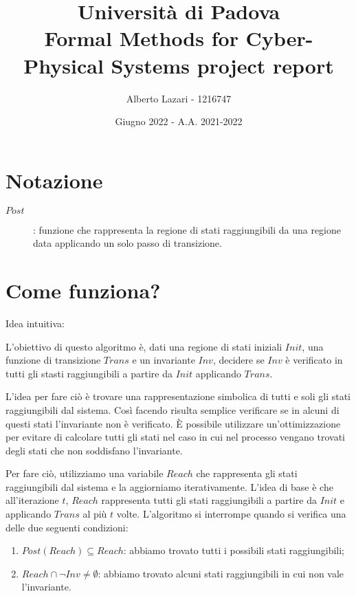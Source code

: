 \documentclass[12pt]{article}
\title{\textbf{Università di Padova \\ Formal Methods for Cyber-Physical Systems project report}}
\author{Alberto Lazari - 1216747\\}
\date{Giugno 2022 - A.A. 2021-2022}
\begin{document}
	\maketitle
	\pagebreak

	\tableofcontents
	\pagebreak

    \section{Notazione}
    \begin{description}
        \item[$Post$]: funzione che rappresenta la regione di stati raggiungibili da una regione data applicando un solo passo di transizione.
    \end{description}

	\section{Come funziona?}
	Idea intuitiva:

    L'obiettivo di questo algoritmo è, dati una regione di stati iniziali $Init$, una funzione di transizione $Trans$ e un invariante $Inv$, decidere se $Inv$ è verificato in tutti gli stasti raggiungibili a partire da $Init$ applicando $Trans$.

    L'idea per fare ciò è trovare una rappresentazione simbolica di tutti e soli gli stati raggiungibili dal sistema.
    Così facendo risulta semplice verificare se in alcuni di questi stati l'invariante non è verificato.
	È possibile utilizzare un'ottimizzazione per evitare di calcolare tutti gli stati nel caso in cui nel processo vengano trovati degli stati che non soddisfano l'invariante.

    Per fare ciò, utilizziamo una variabile $Reach$ che rappresenta gli stati raggiungibili dal sistema e la aggiorniamo iterativamente.
    L'idea di base è che all'iterazione $t$, $Reach$ rappresenta tutti gli stati raggiungibili a partire da $Init$ e applicando $Trans$ al più $t$ volte.
    L'algoritmo si interrompe quando si verifica una delle due seguenti condizioni:
    \begin{enumerate}
        \item $Post(Reach) \subseteq Reach $: abbiamo trovato tutti i possibili stati raggiungibili;
        \item $Reach \cap \neg Inv \neq \emptyset$: abbiamo trovato alcuni stati raggiungibili in cui non vale l'invariante.
    \end{enumerate}
    
\end{document}
